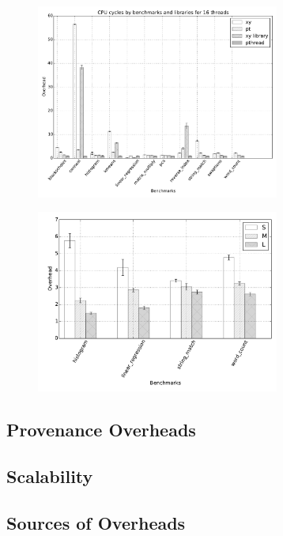 \begin{figure}[h]
\includegraphics[width=8cm]{figure/benchmarks/cpu-cycles-16-threads.pdf}
\end{figure}

\begin{figure}[h]
\includegraphics[width=8cm]{figure/benchmarks/worksize-times-inspector.pdf}
\end{figure}

%

\subsection{Provenance Overheads}



\subsection{\projecttitle Scalability}




\subsection{Sources of Overheads}





